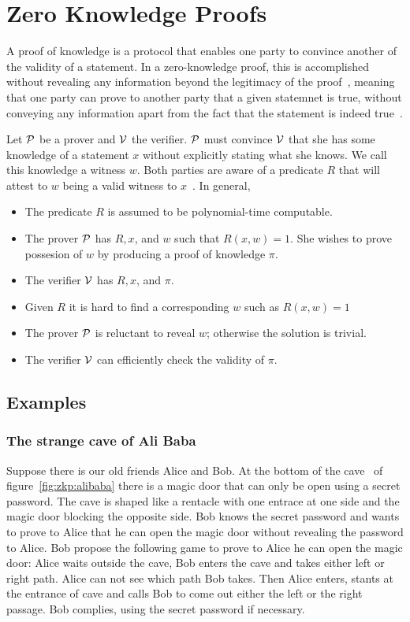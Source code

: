 \chapter{Zero Knowledge Proofs}
\label{zkp}

A proof of knowledge is a protocol that enables one party to convince another of the validity of a statement.
In a zero-knowledge proof, this is accomplished without revealing any information beyond the legitimacy of the proof~\cite{kiagias:crypto},
meaning that one party can prove to another party that a given statemnet is true, without conveying any information apart from
the fact that the statement is indeed true~\cite{wiki:zkp}.

Let $\mathcal{P}$ be a prover and $\mathcal{V}$ the verifier. $\mathcal{P}$ must convince $\mathcal{V}$ that she has some
knowledge of a statement $x$ without explicitly stating what she knows. We call this knowledge a witness $w$.
Both parties are aware of a predicate $R$ that will attest to $w$ being a valid witness to $x$~\cite{kiagias:crypto}. In general,

\begin{itemize}
  \item The predicate $R$ is assumed to be polynomial-time computable.
  \item The prover $\mathcal{P}$ has $R,x$, and $w$ such that $R(x,w) = 1$. She wishes to prove possesion of $w$ by producing a proof of knowledge $\pi$.
  \item The verifier $\mathcal{V}$ has $R,x$, and $\pi$.
  \item Given $R$ it is hard to find a corresponding $w$ such as $R(x,w) = 1$
  \item The prover $\mathcal{P}$ is reluctant to reveal $w$; otherwise the solution is trivial.
  \item The verifier $\mathcal{V}$ can efficiently check the validity of $\pi$.
\end{itemize}

\section{Examples}

\subsection{The strange cave of Ali Baba}
\label{zkp:examples}

Suppose there is our old friends Alice and Bob. At the bottom of the cave~\cite{Quisquater:1989:EZP:118209.118269} of figure~\ref{fig:zkp:alibaba} there is a magic door that
can only be open using a secret password. The cave is shaped like a rentacle with one entrace at one side and the magic door blocking the opposite side.
Bob knows the secret password and wants to prove to Alice that he can open the magic door without revealing the password to Alice.
Bob propose the following game to prove to Alice he can open the magic door: Alice waits outside the cave, Bob enters the cave and
takes either left or right path. Alice can not see which path Bob takes. Then Alice enters, stants at the entrance of cave and calls
Bob to come out either the left or the right passage. Bob complies, using the secret password if necessary.

